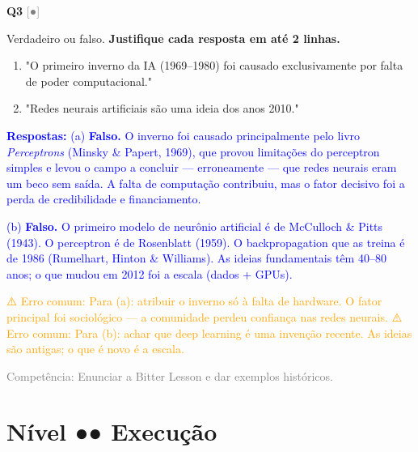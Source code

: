 \documentclass[12pt,a4paper]{article}
\newcommand{\sol}[1]{\textcolor{blue}{#1}}
\newcommand{\errocomum}[1]{\textcolor{orange}{⚠️ Erro comum: #1}}
\newcommand{\competencia}[1]{\textcolor{gray}{Competência: #1}}
\newcommand{\sol}[1]{}
\newcommand{\errocomum}[1]{}
\newcommand{\competencia}[1]{}
\newcommand{\sol}[1]{}
\newcommand{\errocomum}[1]{}
\newcommand{\competencia}[1]{}
\newcommand{\nivel}[1]{\textcolor{gray}{[#1]}}
\newenvironment{questao}[2]{
  \vspace{0.5cm}
  \noindent\textbf{Q#1} \nivel{#2} \quad
}{
  \vspace{0.2cm}
}
\begin{document}
\begin{questao}{3}{●}
  Verdadeiro ou falso. \textbf{Justifique cada resposta em até 2 linhas.}

  \begin{enumerate}[label=(\alph*),nosep]
    \item "O primeiro inverno da IA (1969–1980) foi causado exclusivamente por falta
    de poder computacional."
    \item "Redes neurais artificiais são uma ideia dos anos 2010."
  \end{enumerate}

  \sol{
    \textbf{Respostas:}
    (a) \textbf{Falso.} O inverno foi causado principalmente pelo livro \textit{Perceptrons}
    (Minsky \& Papert, 1969), que provou limitações do perceptron simples e levou o campo
    a concluir — erroneamente — que redes neurais eram um beco sem saída. A falta de
    computação contribuiu, mas o fator decisivo foi a perda de credibilidade e financiamento.

    (b) \textbf{Falso.} O primeiro modelo de neurônio artificial é de McCulloch \& Pitts (1943).
    O perceptron é de Rosenblatt (1959). O backpropagation que as treina é de 1986
    (Rumelhart, Hinton \& Williams). As ideias fundamentais têm 40–80 anos; o que mudou
    em 2012 foi a escala (dados + GPUs).

    \errocomum{Para (a): atribuir o inverno só à falta de hardware. O fator principal foi
    sociológico — a comunidade perdeu confiança nas redes neurais.}
    \errocomum{Para (b): achar que deep learning é uma invenção recente. As ideias são antigas;
    o que é novo é a escala.}

    \competencia{Enunciar a Bitter Lesson e dar exemplos históricos.}
  }
\end{questao}

\section*{Nível ●● \quad Execução}
\end{document}
